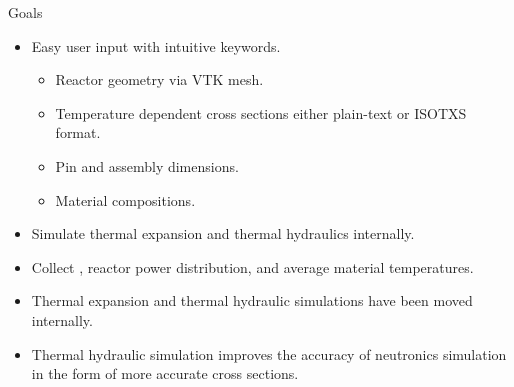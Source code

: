 \begin{frame}{Goals}
  \begin{itemize}
    \item Easy user input with intuitive keywords.
      \begin{itemize}
        \item Reactor geometry via VTK mesh.
        \item Temperature dependent cross sections either plain-text or ISOTXS
          format.
        \item Pin and assembly dimensions.
        \item Material compositions.
      \end{itemize}
    \item Simulate thermal expansion and thermal hydraulics internally.
    \item Collect \keff, reactor power distribution, and average material 
      temperatures.
  \end{itemize}
  \vspace{0.2in}
  \begin{itemize}
    \item Thermal expansion and thermal hydraulic simulations have been moved
      internally.
    \item Thermal hydraulic simulation improves the accuracy of neutronics
      simulation in the form of more accurate cross sections.
  \end{itemize}
\end{frame}
